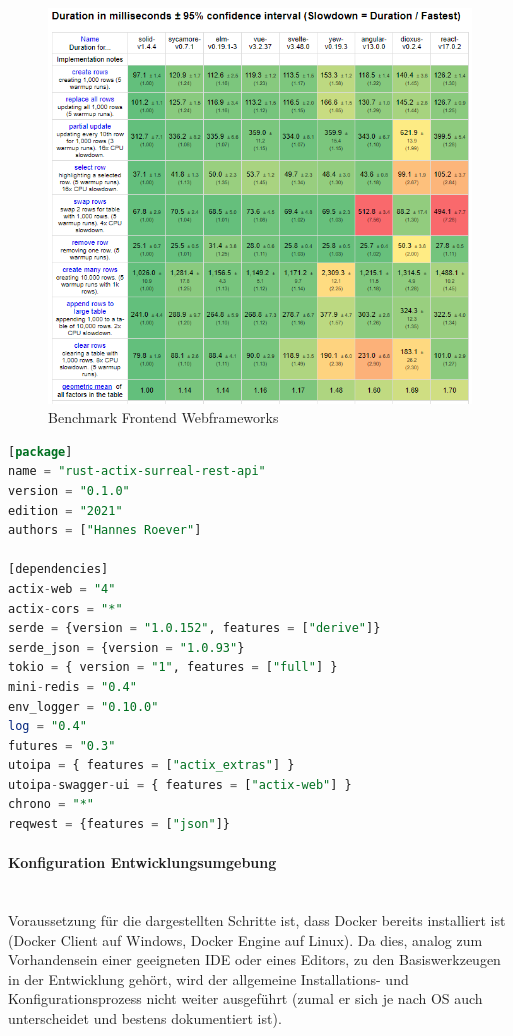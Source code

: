 \documentclass[notitlepage, hidelinks]{article}
\begin{document}
\begin{figure}[H]
\centering
  \includegraphics[width=\textwidth]{images/bm.png}
  \caption{Benchmark Frontend Webframeworks}
  \label{fig:clientbenchmark}
\end{figure}


\begin{lstlisting}[language=SQL,frame=single,caption=cargo.toml Datei zur Organisation der Abhängigkeiten in Rust,label=toml]
[package]
name = "rust-actix-surreal-rest-api"
version = "0.1.0"
edition = "2021"
authors = ["Hannes Roever"]

[dependencies]
actix-web = "4"
actix-cors = "*"
serde = {version = "1.0.152", features = ["derive"]}
serde_json = {version = "1.0.93"}
tokio = { version = "1", features = ["full"] }
mini-redis = "0.4"
env_logger = "0.10.0"
log = "0.4"
futures = "0.3"
utoipa = { features = ["actix_extras"] }
utoipa-swagger-ui = { features = ["actix-web"] }
chrono = "*"
reqwest = {features = ["json"]}
\end{lstlisting}

\paragraph{Konfiguration Entwicklungsumgebung} \mbox{} \\
Voraussetzung für die dargestellten Schritte ist, dass Docker bereits installiert ist (Docker Client auf Windows, Docker Engine auf Linux). Da dies, analog zum Vorhandensein einer geeigneten IDE oder eines Editors, zu den Basiswerkzeugen in der Entwicklung gehört, wird der allgemeine Installations- und Konfigurationsprozess nicht weiter ausgeführt (zumal er sich je nach OS auch unterscheidet und bestens dokumentiert ist).
\end{document}
